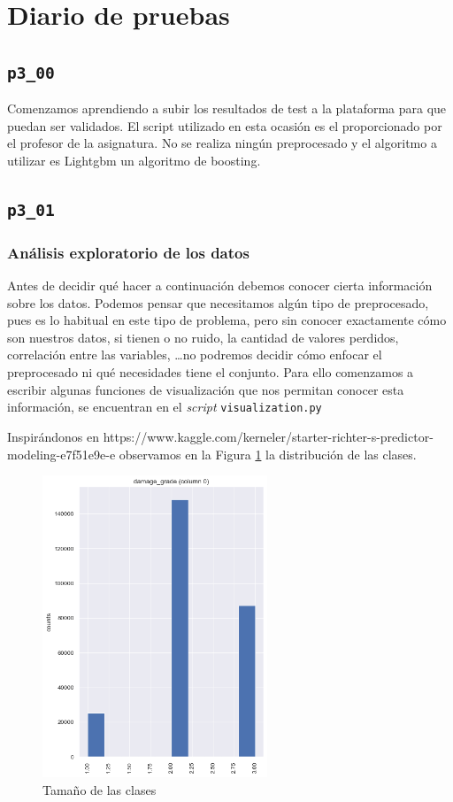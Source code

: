 \documentclass[a4paper, 20pt]{article}
\begin{document}
\section{Diario de pruebas}
\subsection{\texttt{p3\_00}}
Comenzamos aprendiendo a subir los resultados de test a la plataforma para que puedan ser validados. El script utilizado en esta ocasión es el proporcionado por el profesor de la asignatura. No se realiza ningún preprocesado y el algoritmo a utilizar es Lightgbm un algoritmo de boosting.

\subsection{\texttt{p3\_01}}
\subsubsection{Análisis exploratorio de los datos}

Antes de decidir qué hacer a continuación debemos conocer cierta información sobre los datos. Podemos pensar que necesitamos algún tipo de preprocesado, pues es lo habitual en este tipo de problema, pero sin conocer exactamente cómo son nuestros datos, si tienen o no ruido, la cantidad de valores perdidos, correlación entre las variables, \dots no podremos decidir cómo enfocar el preprocesado ni qué necesidades tiene el conjunto. Para ello comenzamos a escribir algunas funciones de visualización que nos permitan conocer esta información, se encuentran en el \textit{script} \texttt{visualization.py}

Inspirándonos en 
https://www.kaggle.com/kerneler/starter-richter-s-predictor-modeling-e7f51e9e-e
observamos en la Figura \ref{fig:tam_clases} la distribución de las clases.

\begin{figure}[H]
    \centering
    \includegraphics[height=0.6\textwidth, width=0.6\textwidth]{260601_dist}
    \caption{Tamaño de las clases}
    \label{fig:tam_clases}
\end{figure}
\end{document}

